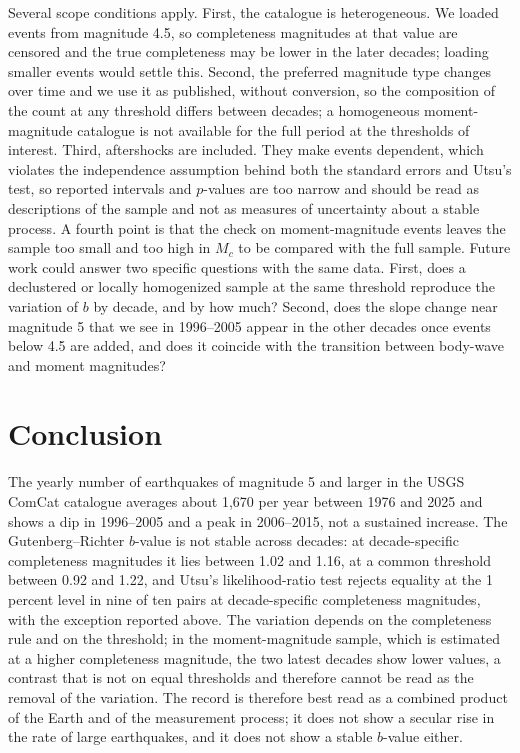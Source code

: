 \documentclass[11pt]{article}
\begin{document}
Several scope conditions apply. First, the catalogue is heterogeneous. We loaded events from magnitude 4.5, so completeness magnitudes at that value are censored and the true completeness may be lower in the later decades; loading smaller events would settle this. Second, the preferred magnitude type changes over time and we use it as published, without conversion, so the composition of the count at any threshold differs between decades; a homogeneous moment-magnitude catalogue is not available for the full period at the thresholds of interest. Third, aftershocks are included. They make events dependent, which violates the independence assumption behind both the standard errors and Utsu's test, so reported intervals and $p$-values are too narrow and should be read as descriptions of the sample and not as measures of uncertainty about a stable process. A fourth point is that the check on moment-magnitude events leaves the sample too small and too high in $M_c$ to be compared with the full sample.
Future work could answer two specific questions with the same data. First, does a declustered or locally homogenized sample at the same threshold reproduce the variation of $b$ by decade, and by how much? Second, does the slope change near magnitude 5 that we see in 1996--2005 appear in the other decades once events below 4.5 are added, and does it coincide with the transition between body-wave and moment magnitudes?

\section{Conclusion}

The yearly number of earthquakes of magnitude 5 and larger in the USGS ComCat catalogue averages about 1,670 per year between 1976 and 2025 and shows a dip in 1996--2005 and a peak in 2006--2015, not a sustained increase. The Gutenberg--Richter $b$-value is not stable across decades: at decade-specific completeness magnitudes it lies between 1.02 and 1.16, at a common threshold between 0.92 and 1.22, and Utsu's likelihood-ratio test rejects equality at the 1 percent level in nine of ten pairs at decade-specific completeness magnitudes, with the exception reported above. The variation depends on the completeness rule and on the threshold; in the moment-magnitude sample, which is estimated at a higher completeness magnitude, the two latest decades show lower values, a contrast that is not on equal thresholds and therefore cannot be read as the removal of the variation. The record is therefore best read as a combined product of the Earth and of the measurement process; it does not show a secular rise in the rate of large earthquakes, and it does not show a stable $b$-value either.



\end{document}
